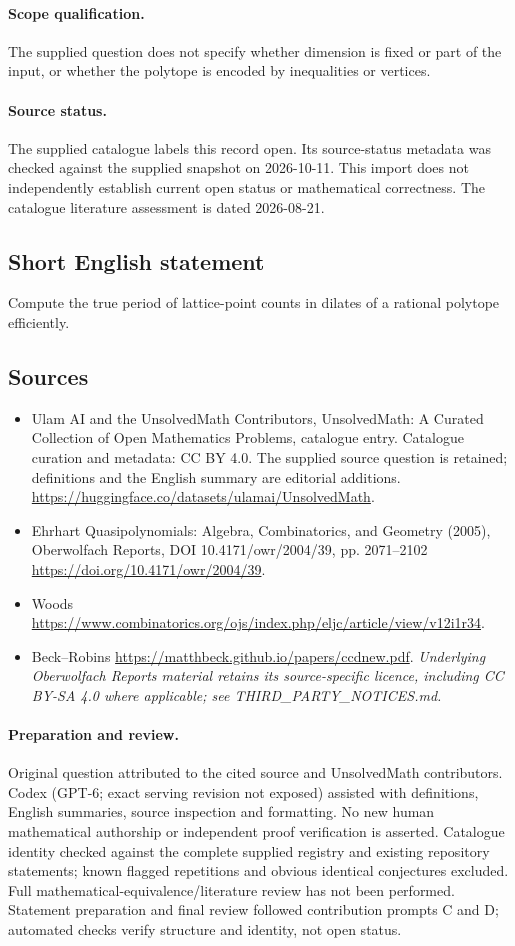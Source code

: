 \documentclass[11pt]{article}
\begin{document}
\paragraph{Scope qualification.}
The supplied question does not specify whether dimension is fixed or part of the input, or whether the polytope is encoded by inequalities or vertices.
\paragraph{Source status.}
The supplied catalogue labels this record open. Its source-status metadata was checked against the supplied snapshot on 2026-10-11. This import does not independently establish current open status or mathematical correctness. The catalogue literature assessment is dated 2026-08-21.
\subsection{Short English statement}
Compute the true period of lattice-point counts in dilates of a rational polytope efficiently.
\subsection{Sources}
\begin{itemize}
\item[S1] Ulam AI and the UnsolvedMath Contributors, UnsolvedMath: A Curated Collection of Open Mathematics Problems, catalogue entry. Catalogue curation and metadata: CC BY 4.0. The supplied source question is retained; definitions and the English summary are editorial additions.
\url{https://huggingface.co/datasets/ulamai/UnsolvedMath}.
\item[S2] Ehrhart Quasipolynomials: Algebra, Combinatorics, and Geometry (2005), Oberwolfach Reports, DOI 10.4171/owr/2004/39, pp. 2071--2102
\url{https://doi.org/10.4171/owr/2004/39}.
\item[S3] Woods
\url{https://www.combinatorics.org/ojs/index.php/eljc/article/view/v12i1r34}.
\item[S4] Beck--Robins
\url{https://matthbeck.github.io/papers/ccdnew.pdf}.
\textit{Underlying Oberwolfach Reports material retains its source-specific licence, including CC BY-SA 4.0 where applicable; see THIRD\_PARTY\_NOTICES.md.}
\end{itemize}
\paragraph{Preparation and review.}
Original question attributed to the cited source and UnsolvedMath contributors. Codex (GPT-6; exact serving revision not exposed) assisted with definitions, English summaries, source inspection and formatting. No new human mathematical authorship or independent proof verification is asserted. Catalogue identity checked against the complete supplied registry and existing repository statements; known flagged repetitions and obvious identical conjectures excluded. Full mathematical-equivalence/literature review has not been performed. Statement preparation and final review followed contribution prompts C and D; automated checks verify structure and identity, not open status.
\label{end:statement}
\end{document}
